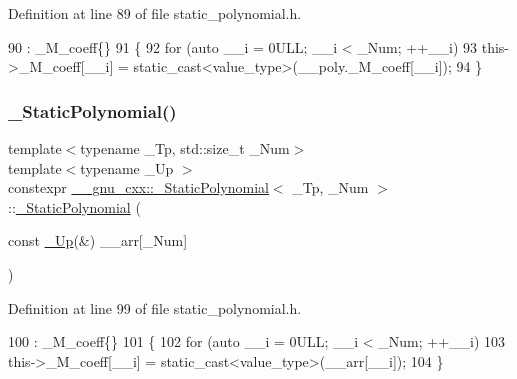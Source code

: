 Definition at line 89 of file static\+\_\+polynomial.\+h.


\begin{DoxyCode}
90         : \_M\_coeff\{\}
91         \{
92           \textcolor{keywordflow}{for} (\textcolor{keyword}{auto} \_\_i = 0ULL; \_\_i < \_Num; ++\_\_i)
93             this->\_M\_coeff[\_\_i] = static\_cast<value\_type>(\_\_poly.\_M\_coeff[\_\_i]);
94         \}
\end{DoxyCode}
\mbox{\label{class____gnu__cxx_1_1__StaticPolynomial_a642809592b993037c2a373986342eaf7}} 
\subsubsection{\texorpdfstring{\+\_\+\+Static\+Polynomial()}{\_StaticPolynomial()}\hspace{0.1cm}{\footnotesize\ttfamily [4/7]}}
{\footnotesize\ttfamily template$<$typename \+\_\+\+Tp, std\+::size\+\_\+t \+\_\+\+Num$>$ \\
template$<$typename \+\_\+\+Up $>$ \\
constexpr \hyperlink{class____gnu__cxx_1_1__StaticPolynomial}{\+\_\+\+\_\+gnu\+\_\+cxx\+::\+\_\+\+Static\+Polynomial}$<$ \+\_\+\+Tp, \+\_\+\+Num $>$\+::\hyperlink{class____gnu__cxx_1_1__StaticPolynomial}{\+\_\+\+Static\+Polynomial} (\begin{DoxyParamCaption}\item[{const \hyperlink{namespace____gnu__cxx_ab693ea357b6429b331e0bf09f9442385}{\+\_\+\+Up}(\&)}]{\+\_\+\+\_\+arr\mbox{[}\+\_\+\+Num\mbox{]} }\end{DoxyParamCaption})\hspace{0.3cm}{\ttfamily [inline]}}



Definition at line 99 of file static\+\_\+polynomial.\+h.


\begin{DoxyCode}
100         : \_M\_coeff\{\}
101         \{
102           \textcolor{keywordflow}{for} (\textcolor{keyword}{auto} \_\_i = 0ULL; \_\_i < \_Num; ++\_\_i)
103             this->\_M\_coeff[\_\_i] = static\_cast<value\_type>(\_\_arr[\_\_i]);
104         \}
\end{DoxyCode}
\mbox{\label{class____gnu__cxx_1_1__StaticPolynomial_a0d3bd778583b9df03f335d23881aa051}} 
